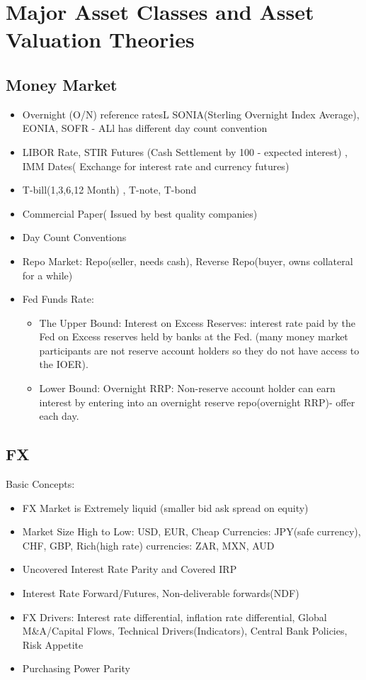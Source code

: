 \documentclass[11pt, openany]{book}              %
\begin{document}
\chapter{Major Asset Classes and Asset Valuation Theories}
\section{Money Market}

\begin{itemize}
    \item Overnight (O/N) reference ratesL SONIA(Sterling Overnight Index Average), EONIA, SOFR - ALl has different day count convention
    \item LIBOR Rate, STIR Futures (Cash Settlement by 100 - expected interest) , IMM Dates( Exchange for interest rate and currency futures)
    \item T-bill(1,3,6,12 Month) , T-note, T-bond
    \item Commercial Paper( Issued by best quality companies)
    \item Day Count Conventions
    \item Repo Market: Repo(seller, needs cash), Reverse Repo(buyer, owns collateral for a while)
    \item Fed Funds Rate: 
    \begin{itemize}
    	\item The Upper Bound: Interest on Excess Reserves: interest rate paid by the Fed on Excess reserves held by banks at the Fed. (many money market participants are not reserve account holders so they do not have access to the IOER). 
    	\item Lower Bound: Overnight RRP: Non-reserve account holder can earn interest by entering into an overnight reserve repo(overnight RRP)- offer each day.
    \end{itemize}
\end{itemize}

\section{FX}

Basic Concepts:
\begin{itemize}
    \item FX Market is Extremely liquid (smaller bid ask spread on equity) 
    \item Market Size High to Low: USD, EUR, Cheap Currencies: JPY(safe currency), CHF, GBP, Rich(high rate) currencies: ZAR, MXN, AUD 
    \item Uncovered Interest Rate Parity and Covered IRP
    \item Interest Rate Forward/Futures, Non-deliverable forwards(NDF)
    \item FX Drivers: Interest rate differential, inflation rate differential, Global M\&A/Capital Flows, Technical Drivers(Indicators), Central Bank Policies, Risk Appetite
    \item Purchasing Power Parity
\end{itemize}
\end{document}
